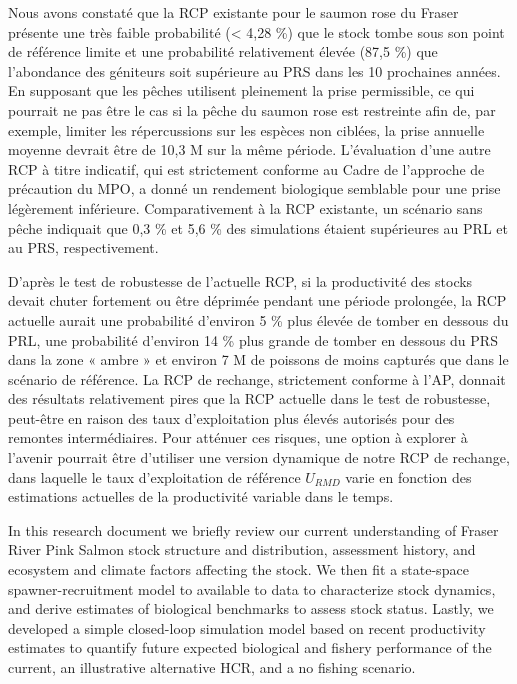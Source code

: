 \documentclass[french,11pt]{book}
\begin{document}
Nous avons constaté que la RCP existante pour le saumon rose du Fraser présente une très faible probabilité (\textless{} 4,28 \%) que le stock tombe sous son point de référence limite et une probabilité relativement élevée (87,5 \%) que l'abondance des géniteurs soit supérieure au PRS dans les 10 prochaines années. En supposant que les pêches utilisent pleinement la prise permissible, ce qui pourrait ne pas être le cas si la pêche du saumon rose est restreinte afin de, par exemple, limiter les répercussions sur les espèces non ciblées, la prise annuelle moyenne devrait être de 10,3 M sur la même période. L'évaluation d'une autre RCP à titre indicatif, qui est strictement conforme au Cadre de l'approche de précaution du MPO, a donné un rendement biologique semblable pour une prise légèrement inférieure. Comparativement à la RCP existante, un scénario sans pêche indiquait que 0,3 \% et 5,6 \% des simulations étaient supérieures au PRL et au PRS, respectivement.

D'après le test de robustesse de l'actuelle RCP, si la productivité des stocks devait chuter fortement ou être déprimée pendant une période prolongée, la RCP actuelle aurait une probabilité d'environ 5 \% plus élevée de tomber en dessous du PRL, une probabilité d'environ 14 \% plus grande de tomber en dessous du PRS dans la zone « ambre » et environ 7 M de poissons de moins capturés que dans le scénario de référence. La RCP de rechange, strictement conforme à l'AP, donnait des résultats relativement pires que la RCP actuelle dans le test de robustesse, peut-être en raison des taux d'exploitation plus élevés autorisés pour des remontes intermédiaires. Pour atténuer ces risques, une option à explorer à l'avenir pourrait être d'utiliser une version dynamique de notre RCP de rechange, dans laquelle le taux d'exploitation de référence \(U_{RMD}\) varie en fonction des estimations actuelles de la productivité variable dans le temps.

In this research document we briefly review our current understanding of Fraser River Pink Salmon stock structure and distribution, assessment history, and ecosystem and climate factors affecting the stock. We then fit a state-space spawner-recruitment model to available to data to characterize stock dynamics, and derive estimates of biological benchmarks to assess stock status. Lastly, we developed a simple closed-loop simulation model based on recent productivity estimates to quantify future expected biological and fishery performance of the current, an illustrative alternative HCR, and a no fishing scenario.
\end{document}
